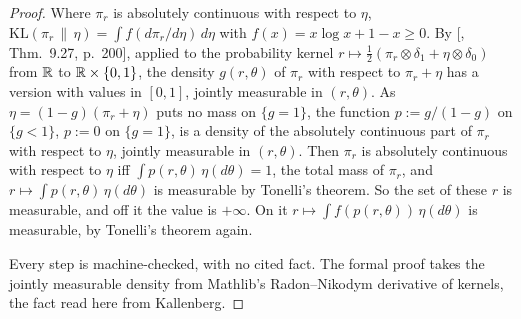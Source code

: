 \begin{proof}
\leanok
Where $\pi_r$ is absolutely continuous with respect to $\eta$,
$\mathrm{KL}(\pi_r \,\|\, \eta) = \int f(d\pi_r/d\eta)\,d\eta$ with $f(x) = x\log x + 1 - x \ge 0$.
By [, Thm.~9.27, p.~200], applied to the probability kernel
$r \mapsto \tfrac12(\pi_r \otimes \delta_1 + \eta \otimes \delta_0)$ from $\mathbb{R}$ to
$\mathbb{R} \times \{0, 1\}$, the density $g(r, \theta)$ of $\pi_r$ with respect to $\pi_r + \eta$ has a
version with values in $[0, 1]$, jointly measurable in $(r, \theta)$. As
$\eta = (1 - g)(\pi_r + \eta)$ puts no mass on $\{g = 1\}$, the function $p := g/(1 - g)$ on
$\{g < 1\}$, $p := 0$ on $\{g = 1\}$, is a density of the absolutely continuous part of $\pi_r$
with respect to $\eta$, jointly measurable in $(r, \theta)$. Then $\pi_r$ is absolutely continuous with respect
to $\eta$ iff $\int p(r, \theta)\,\eta(d\theta) = 1$, the total mass of $\pi_r$, and
$r \mapsto \int p(r, \theta)\,\eta(d\theta)$ is measurable by Tonelli's theorem. So the set of these
$r$ is measurable, and off it the value is $+\infty$. On it $r \mapsto \int f(p(r, \theta))\,
\eta(d\theta)$ is measurable, by Tonelli's theorem again.

Every step is machine-checked, with no cited fact. The formal proof takes the jointly measurable
density from Mathlib's Radon--Nikodym derivative of kernels, the fact read here from Kallenberg.
\end{proof}

